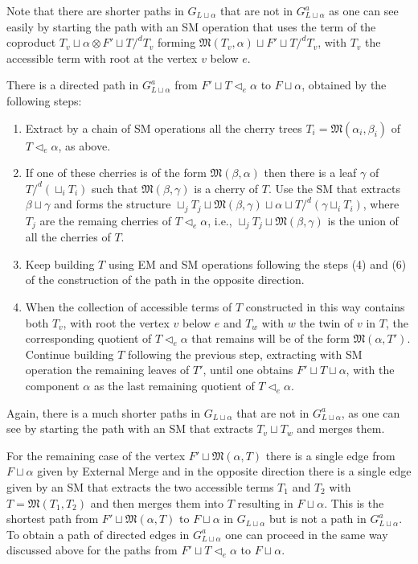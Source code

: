 \documentclass[12pt]{amsart}
\numberwithin{equation}{section}
\def\fM{{\mathfrak M}}
\begin{document}
Note that there are shorter paths in $G_{L\sqcup \alpha}$ that are not in $G_{L\sqcup \alpha}^a$ as one
can see easily by starting the path with an SM operation that uses the term of the 
coproduct $T_v \sqcup \alpha \otimes F' \sqcup T/^d T_v$ forming
$\fM(T_v, \alpha) \sqcup F' \sqcup T/^d T_v$,
with $T_v$ the accessible term  with root at the vertex $v$ below $e$.

\smallskip

There is a directed path in $G^a_{L \sqcup \alpha}$ from $F'\sqcup T \lhd_e \alpha$
to $F \sqcup \alpha$, obtained by the following steps:
\begin{enumerate}
\item Extract by a chain of SM operations all the cherry trees $T_i=\fM(\alpha_i,\beta_i)$ of $T \lhd_e \alpha$, as above.
\item If one of these cherries is of the form $\fM(\beta,\alpha)$ then there is a leaf $\gamma$ of $T/^d (\sqcup_i T_i)$
such that $\fM(\beta,\gamma)$ is a cherry of $T$. Use the SM that extracts $\beta\sqcup \gamma$ and forms
the structure $\sqcup_j T_j \sqcup \fM(\beta,\gamma) \sqcup \alpha \sqcup T/^d (\gamma \sqcup_i T_i)$,
where $T_j$ are the remaing cherries of $T \lhd_e \alpha$, i.e., $\sqcup_j T_j \sqcup \fM(\beta,\gamma)$ is the
union of all the cherries of $T$. 
\item Keep building $T$ using EM and SM operations following the steps (4) and (6) of the construction
of the path in the opposite direction.
\item When the collection of accessible terms of $T$ constructed in this way contains both $T_v$, with root
the vertex $v$ below $e$ and $T_w$ with $w$ the twin of $v$ in $T$, the corresponding quotient of
$T\lhd_e \alpha$ that remains will be of the form $\fM(\alpha, T')$. Continue building $T$ following the
previous step, extracting with SM operation the remaining leaves of $T'$, until one obtains $F' \sqcup T\sqcup \alpha$,
with the component $\alpha$ as the last remaining quotient of $T \lhd_e \alpha$.
\end{enumerate}

Again, there is a much shorter paths in $G_{L\sqcup \alpha}$ that are not in $G^a_{L\sqcup \alpha}$,
as one can see by starting the path with an SM that extracts $T_v \sqcup T_w$ and merges them. 

\smallskip

For the remaining case of the vertex $F'\sqcup \fM(\alpha, T)$ there
is a single edge from $F \sqcup \alpha$ given by External Merge and in the opposite direction there is
a single edge given by an SM that extracts the two accessible terms $T_1$ and $T_2$ with
$T=\fM(T_1,T_2)$ and then merges them into $T$ resulting in $F \sqcup \alpha$.
This is the shortest path from $F'\sqcup \fM(\alpha, T)$ to $F \sqcup \alpha$ in $G_{L \sqcup \alpha}$
but is not a path in $G^a_{L \sqcup \alpha}$. To obtain a path of directed edges in $G^a_{L \sqcup \alpha}$ 
one can proceed in the same way discussed above for the paths from 
$F'\sqcup T \lhd_e \alpha$ to $F \sqcup \alpha$. 
\endproof
\end{document}
